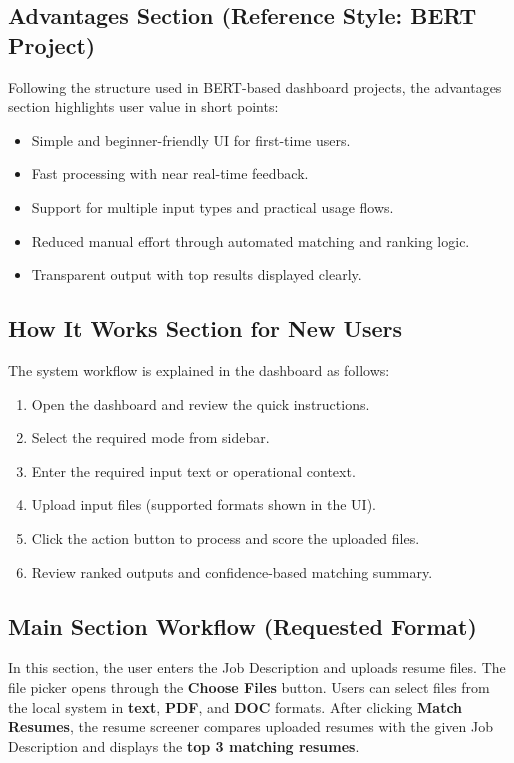 \subsection{Advantages Section (Reference Style: BERT Project)}

Following the structure used in BERT-based dashboard projects, the advantages section highlights user value in short points:

\begin{itemize}
    \item Simple and beginner-friendly UI for first-time users.
    \item Fast processing with near real-time feedback.
    \item Support for multiple input types and practical usage flows.
    \item Reduced manual effort through automated matching and ranking logic.
    \item Transparent output with top results displayed clearly.
\end{itemize}

\subsection{How It Works Section for New Users}

The system workflow is explained in the dashboard as follows:

\begin{enumerate}
    \item Open the dashboard and review the quick instructions.
    \item Select the required mode from sidebar.
    \item Enter the required input text or operational context.
    \item Upload input files (supported formats shown in the UI).
    \item Click the action button to process and score the uploaded files.
    \item Review ranked outputs and confidence-based matching summary.
\end{enumerate}

\subsection{Main Section Workflow (Requested Format)}

In this section, the user enters the Job Description and uploads resume files. The file picker opens through the \textbf{Choose Files} button. Users can select files from the local system in \textbf{text}, \textbf{PDF}, and \textbf{DOC} formats. After clicking \textbf{Match Resumes}, the resume screener compares uploaded resumes with the given Job Description and displays the \textbf{top 3 matching resumes}.

